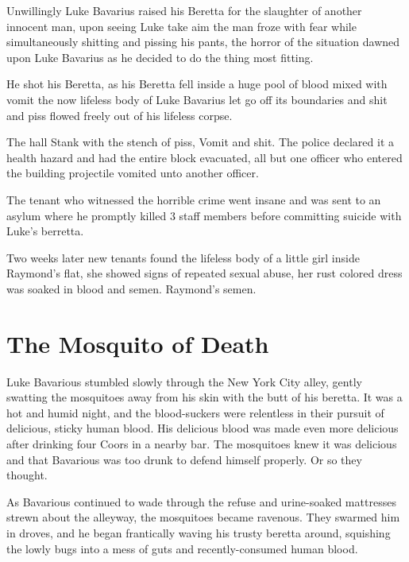 Unwillingly Luke Bavarius raised his Beretta for the slaughter of
another innocent man, upon seeing Luke take aim the man froze with
fear while simultaneously shitting and pissing his pants, the
horror of the situation dawned upon Luke Bavarius as he decided to
do the thing most fitting.



He shot his Beretta, as his Beretta fell inside a huge pool of
blood mixed with vomit the now lifeless body of Luke Bavarius let
go off its boundaries and shit and piss flowed freely out of his
lifeless corpse.



The hall Stank with the stench of piss, Vomit and shit. The police
declared it a health hazard and had the entire block evacuated, all
but one officer who entered the building projectile vomited unto
another officer.



The tenant who witnessed the horrible crime went insane and was
sent to an asylum where he promptly killed 3 staff members before
committing suicide with Luke's berretta.



Two weeks later new tenants found the lifeless body of a little
girl inside Raymond's flat, she showed signs of repeated
sexual abuse, her rust colored dress was soaked in blood and semen.
Raymond's semen.


 



\chapter{The Mosquito of Death}



Luke Bavarious stumbled slowly through the New York City alley,
gently swatting the mosquitoes away from his skin with the butt of
his beretta. It was a hot and humid night, and the blood-suckers
were relentless in their pursuit of delicious, sticky human blood.
His delicious blood was made even more delicious after drinking
four Coors in a nearby bar. The mosquitoes knew it was delicious
and that Bavarious was too drunk to defend himself properly. Or so
they thought.



As Bavarious continued to wade through the refuse and urine-soaked
mattresses strewn about the alleyway, the mosquitoes became
ravenous. They swarmed him in droves, and he began frantically
waving his trusty beretta around, squishing the lowly bugs into a
mess of guts and recently-consumed human blood.



